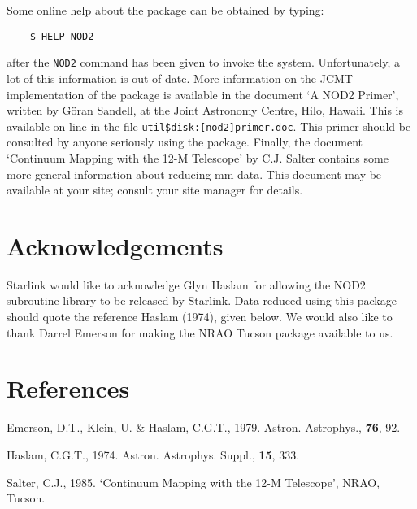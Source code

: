 Some online help about the package can be obtained by typing:
\begin{verbatim}
    $ HELP NOD2
\end{verbatim}
after the {\tt NOD2} command has been given to invoke the system.
Unfortunately, a lot of this information is out of date. More
information on the JCMT implementation of the package is available
in the document `A NOD2 Primer', written by G\"{o}ran Sandell, at
the Joint Astronomy Centre, Hilo, Hawaii. This is available on-line
in the file {\tt util\$disk:[nod2]primer.doc}. This primer should
be consulted by anyone seriously using the package. Finally, the
document `Continuum Mapping with the 12-M Telescope' by C.J. Salter
contains some more general information about reducing mm data.
This document may be available at your site; consult your site manager
for details.

\section {Acknowledgements}

Starlink would like to acknowledge Glyn Haslam for allowing the NOD2
subroutine library to be released by Starlink. Data reduced using this
package should quote the reference Haslam (1974), given below. We
would also like to thank Darrel Emerson for making the NRAO Tucson
package available to us.

\section {References}

Emerson, D.T., Klein, U. \& Haslam, C.G.T., 1979. Astron. Astrophys.,
{\bf 76}, 92.

Haslam, C.G.T., 1974. Astron. Astrophys. Suppl., {\bf 15}, 333.

Salter, C.J., 1985. `Continuum Mapping with the 12-M Telescope',
NRAO, Tucson.





